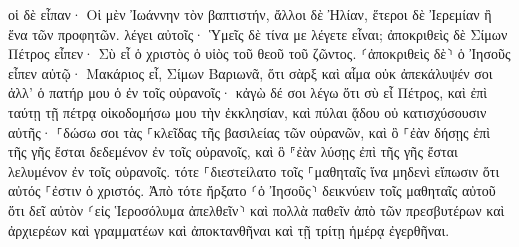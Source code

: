 \documentclass{openreader}
\begin{document}
οἱ δὲ εἶπαν· Οἱ μὲν Ἰωάννην τὸν βαπτιστήν, ἄλλοι δὲ Ἠλίαν, ἕτεροι δὲ Ἰερεμίαν ἢ ἕνα τῶν προφητῶν. 
λέγει αὐτοῖς· Ὑμεῖς δὲ τίνα με λέγετε εἶναι; 
ἀποκριθεὶς δὲ Σίμων Πέτρος εἶπεν· Σὺ εἶ ὁ χριστὸς ὁ υἱὸς τοῦ θεοῦ τοῦ ζῶντος. 
⸂ἀποκριθεὶς δὲ⸃ ὁ Ἰησοῦς εἶπεν αὐτῷ· Μακάριος εἶ, Σίμων Βαριωνᾶ, ὅτι σὰρξ καὶ αἷμα οὐκ ἀπεκάλυψέν σοι ἀλλ’ ὁ πατήρ μου ὁ ἐν τοῖς οὐρανοῖς· 
κἀγὼ δέ σοι λέγω ὅτι σὺ εἶ Πέτρος, καὶ ἐπὶ ταύτῃ τῇ πέτρᾳ οἰκοδομήσω μου τὴν ἐκκλησίαν, καὶ πύλαι ᾅδου οὐ κατισχύσουσιν αὐτῆς· 
⸀δώσω σοι τὰς ⸀κλεῖδας τῆς βασιλείας τῶν οὐρανῶν, καὶ ὃ ⸀ἐὰν δήσῃς ἐπὶ τῆς γῆς ἔσται δεδεμένον ἐν τοῖς οὐρανοῖς, καὶ ὃ ⸁ἐὰν λύσῃς ἐπὶ τῆς γῆς ἔσται λελυμένον ἐν τοῖς οὐρανοῖς. 
τότε ⸀διεστείλατο τοῖς ⸀μαθηταῖς ἵνα μηδενὶ εἴπωσιν ὅτι αὐτός ⸀ἐστιν ὁ χριστός. 
Ἀπὸ τότε ἤρξατο ⸂ὁ Ἰησοῦς⸃ δεικνύειν τοῖς μαθηταῖς αὐτοῦ ὅτι δεῖ αὐτὸν ⸂εἰς Ἱεροσόλυμα ἀπελθεῖν⸃ καὶ πολλὰ παθεῖν ἀπὸ τῶν πρεσβυτέρων καὶ ἀρχιερέων καὶ γραμματέων καὶ ἀποκτανθῆναι καὶ τῇ τρίτῃ ἡμέρᾳ ἐγερθῆναι. 
\end{document}
